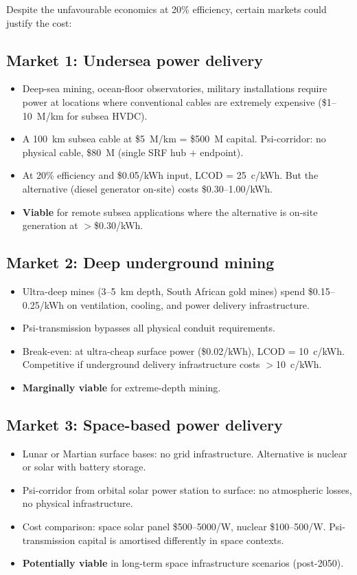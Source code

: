 \documentclass[11pt]{article}
\begin{document}
Despite the unfavourable economics at 20\% efficiency, certain markets
could justify the cost:

\subsection{Market 1: Undersea power delivery}

\begin{itemize}[nosep]
  \item Deep-sea mining, ocean-floor observatories, military
    installations require power at locations where conventional cables
    are extremely expensive (\$1--10~M/km for subsea HVDC).
  \item A 100~km subsea cable at \$5~M/km = \$500~M capital.
    Psi-corridor: no physical cable, \$80~M (single SRF hub + endpoint).
  \item At 20\% efficiency and \$0.05/kWh input, LCOD = 25~c/kWh.
    But the alternative (diesel generator on-site) costs \$0.30--1.00/kWh.
  \item \textbf{Viable} for remote subsea applications where the
    alternative is on-site generation at $>$\$0.30/kWh.
\end{itemize}

\subsection{Market 2: Deep underground mining}

\begin{itemize}[nosep]
  \item Ultra-deep mines (3--5~km depth, South African gold mines)
    spend \$0.15--0.25/kWh on ventilation, cooling, and power delivery
    infrastructure.
  \item Psi-transmission bypasses all physical conduit requirements.
  \item Break-even: at ultra-cheap surface power (\$0.02/kWh),
    LCOD = 10~c/kWh. Competitive if underground delivery infrastructure
    costs $>$10~c/kWh.
  \item \textbf{Marginally viable} for extreme-depth mining.
\end{itemize}

\subsection{Market 3: Space-based power delivery}

\begin{itemize}[nosep]
  \item Lunar or Martian surface bases: no grid infrastructure.
    Alternative is nuclear or solar with battery storage.
  \item Psi-corridor from orbital solar power station to surface:
    no atmospheric losses, no physical infrastructure.
  \item Cost comparison: space solar panel \$500--5000/W, nuclear
    \$100--500/W. Psi-transmission capital is amortised differently
    in space contexts.
  \item \textbf{Potentially viable} in long-term space infrastructure
    scenarios (post-2050).
\end{itemize}
\end{document}
